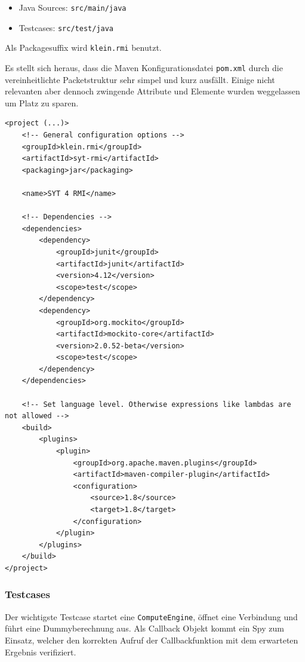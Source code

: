\begin{itemize}
    \item Java Sources: \texttt{src/main/java}
    \item Testcases: \texttt{src/test/java}
\end{itemize}

Als Packagesuffix wird \texttt{klein.rmi} benutzt.

Es stellt sich heraus, dass die Maven Konfigurationsdatei \texttt{pom.xml} durch die vereinheitlichte Packetstruktur sehr simpel und kurz ausf\"allt.
Einige nicht relevanten aber dennoch zwingende Attribute und Elemente wurden weggelassen um Platz zu sparen.

\begin{lstlisting}[style=XML, caption=Maven Konfigurationsdatei]
<project (...)>
    <!-- General configuration options -->
    <groupId>klein.rmi</groupId>
    <artifactId>syt-rmi</artifactId>
    <packaging>jar</packaging>

    <name>SYT 4 RMI</name>

    <!-- Dependencies -->
    <dependencies>
        <dependency>
            <groupId>junit</groupId>
            <artifactId>junit</artifactId>
            <version>4.12</version>
            <scope>test</scope>
        </dependency>
        <dependency>
            <groupId>org.mockito</groupId>
            <artifactId>mockito-core</artifactId>
            <version>2.0.52-beta</version>
            <scope>test</scope>
        </dependency>
    </dependencies>

    <!-- Set language level. Otherwise expressions like lambdas are not allowed -->
    <build>
        <plugins>
            <plugin>
                <groupId>org.apache.maven.plugins</groupId>
                <artifactId>maven-compiler-plugin</artifactId>
                <configuration>
                    <source>1.8</source>
                    <target>1.8</target>
                </configuration>
            </plugin>
        </plugins>
    </build>
</project>
\end{lstlisting}

\subsubsection{Testcases}
Der wichtigste Testcase startet eine \texttt{ComputeEngine}, \"offnet eine Verbindung und f\"uhrt eine Dummyberechnung aus.
Als Callback Objekt kommt ein Spy zum Einsatz, welcher den korrekten Aufruf der Callbackfunktion mit dem erwarteten Ergebnis verifiziert.

